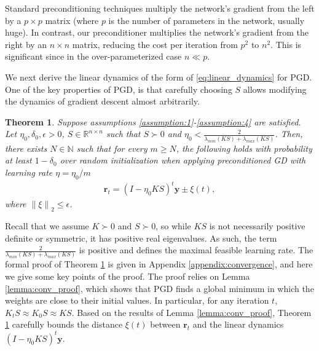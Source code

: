 \documentclass[10pt]{article} %
\theoremstyle{plain}
\newtheorem{theorem}{Theorem}[section]
\theoremstyle{definition}
\theoremstyle{remark}
\newcommand{\Real}{\mathbb{R}}
\newcommand{\norm}[1]{\left\lVert#1\right\rVert}
\newcommand{\y}{\mathbf{y}}
\newcommand{\res}{\mathbf{r}}
\begin{document}
Standard preconditioning techniques multiply the network's gradient from the left by a $p\times p$ matrix (where $p$ is the number of parameters in the network, usually huge). In contrast, our preconditioner multiplies the network's gradient from the right by an $n\times n$ matrix, reducing the cost per iteration from $p^2$ to $n^2$. This is significant since in the over-parameterized case $n \ll p$.


We next derive the linear dynamics of the form of \eqref{eq:linear_dynamics} for PGD. 
One of the key properties of PGD, is that carefully choosing $S$ allows modifying the dynamics of gradient descent almost arbitrarily.


\begin{theorem}\label{Thm:precond_dynamic}
Suppose assumptions \ref{assumption:1}-\ref{assumption:4} are satisfied. Let $\eta_0, \delta_0, \epsilon > 0$,  $S \in \Real^{n \times n}$ such that $S \succ 0$ and $\eta_0 < \frac{2}{\lambda_{min}(KS)+\lambda_{max}(KS)}$. Then, there
exists $N \in  \mathbb{N}$ such that for every $m \geq N$, the following holds with probability at
least $1-\delta_0$ over random initialization when applying preconditioned GD with learning rate $\eta=\eta_0/m$ 
\begin{align*}
    \res_t=(I-\eta_0 K S)^t \y \pm \xi(t), 
\end{align*}
where $\norm{\xi}_2\leq \epsilon$. 
\end{theorem}

Recall that we assume $K \succ 0$ and $S \succ 0$, so while $KS$ is not necessarily positive definite or symmetric, it has positive real eigenvalues. As such, the term $\frac{2}{\lambda_{min}(KS)+\lambda_{max}(KS)}$ is positive and defines the maximal feasible learning rate.
The formal proof of Theorem \ref{Thm:precond_dynamic} is given in Appendix \ref{appendix:convergence}, and here we give some key points of the proof.
The proof relies on Lemma \ref{lemma:conv_proof}, which shows that PGD finds a global minimum in which the weights are close to their initial values. In particular, for any iteration $t$, $K_tS\approx K_0S\approx KS$. Based on the results of Lemma \ref{lemma:conv_proof}, Theorem \ref{Thm:precond_dynamic} carefully bounds the distance $\xi(t)$ between $\res_t$ and the linear dynamics $(I-\eta_0 K S)^t\y$. 
\end{document}
